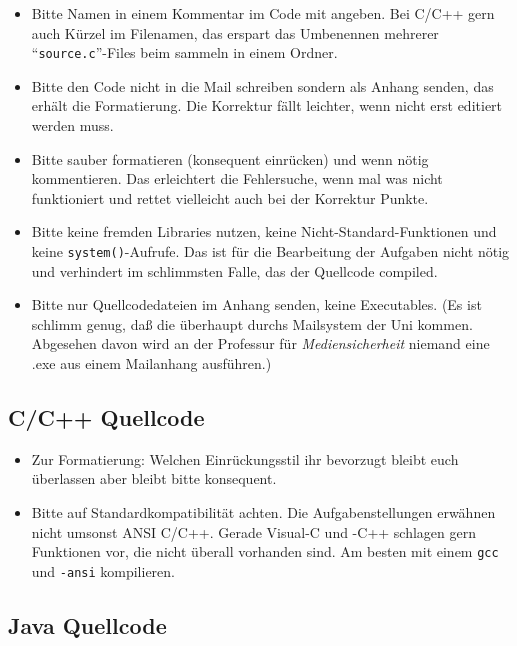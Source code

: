 \documentclass[%
	final, %
	normalheadings, %
	ngerman, %
	a4paper,
	1.1headlines, %
	pagesize, %
	halfparskip, %
	pointlessnumbers, %
	fleqn, %
]{scrartcl} %
\begin{document}
\begin{itemize}
    \item Bitte Namen in einem Kommentar im Code mit angeben. Bei C/C++ gern
          auch Kürzel im Filenamen, das erspart das Umbenennen mehrerer
          ``\texttt{source.c}''-Files beim sammeln in einem Ordner.
    \item Bitte den Code nicht in die Mail schreiben sondern als Anhang senden,
          das erhält die Formatierung. Die Korrektur fällt leichter, wenn
          nicht erst editiert werden muss.
    \item Bitte sauber formatieren (konsequent einrücken) und wenn nötig
          kommentieren. Das erleichtert die Fehlersuche, wenn mal was nicht
          funktioniert und rettet vielleicht auch bei der Korrektur Punkte.
    \item Bitte keine fremden Libraries nutzen, keine Nicht-Standard-Funktionen
          und keine \texttt{system()}-Aufrufe. Das ist für die Bearbeitung der
          Aufgaben nicht nötig und verhindert im schlimmsten Falle, das der
          Quellcode compiled.
    \item Bitte nur Quellcodedateien im Anhang senden, keine Executables.
          (Es ist schlimm genug, daß die überhaupt durchs Mailsystem der Uni
          kommen. Abgesehen davon wird an der Professur für
          \textit{Mediensicherheit} niemand eine .exe aus einem Mailanhang
          ausführen.)
\end{itemize}

\subsection{C/C++ Quellcode}

\begin{itemize}
    \item Zur Formatierung: Welchen Einrückungsstil ihr bevorzugt bleibt euch
          überlassen aber bleibt bitte konsequent.
    \item Bitte auf Standardkompatibilität achten. Die Aufgabenstellungen
          erwähnen nicht umsonst ANSI C/C++. Gerade Visual-C und -C++ schlagen
          gern Funktionen vor, die nicht überall vorhanden sind. Am besten mit
          einem \texttt{gcc} und \texttt{-ansi} kompilieren.
\end{itemize}

\subsection{Java Quellcode}
\end{document}
